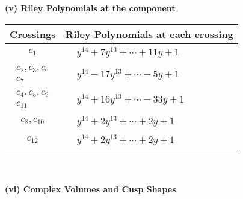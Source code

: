 \documentclass[1p]{elsarticle_modified}
\theoremstyle{definition}
\begin{document}
\newpage\renewcommand{\arraystretch}{1}
\flushleft \textbf{(v) Riley Polynomials at the component}\newline \\
\begin{tabular}{m{50pt}|m{274pt}}
Crossings & \hspace{64pt}Riley Polynomials at each crossing \\
\hline $$\begin{aligned}c_{1}\end{aligned}$$&$\begin{aligned}
&y^{14}+7 y^{13}+\cdots+11 y+1
\end{aligned}$\\
\hline $$\begin{aligned}c_{2},c_{3},c_{6}\\c_{7}\end{aligned}$$&$\begin{aligned}
&y^{14}-17 y^{13}+\cdots-5 y+1
\end{aligned}$\\
\hline $$\begin{aligned}c_{4},c_{5},c_{9}\\c_{11}\end{aligned}$$&$\begin{aligned}
&y^{14}+16 y^{13}+\cdots-33 y+1
\end{aligned}$\\
\hline $$\begin{aligned}c_{8},c_{10}\end{aligned}$$&$\begin{aligned}
&y^{14}+2 y^{13}+\cdots+2 y+1
\end{aligned}$\\
\hline $$\begin{aligned}c_{12}\end{aligned}$$&$\begin{aligned}
&y^{14}+2 y^{13}+\cdots+2 y+1
\end{aligned}$\\
\hline
\end{tabular}\\~\\
\newpage\flushleft \textbf{(vi) Complex Volumes and Cusp Shapes}
\end{document}
